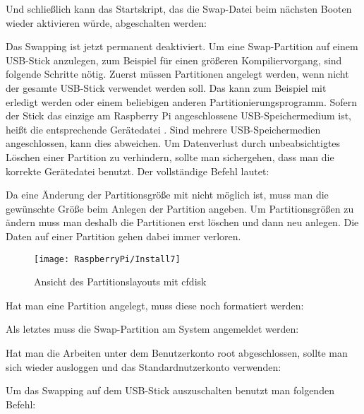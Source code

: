 
Und schließlich kann das Startskript, das die Swap-Datei beim nächsten Booten wieder aktivieren würde, abgeschalten werden:


Das Swapping ist jetzt permanent deaktiviert. Um eine Swap-Partition auf einem USB-Stick anzulegen, zum Beispiel für einen größeren Kompiliervorgang, sind folgende Schritte nötig. Zuerst müssen Partitionen angelegt werden, wenn nicht der gesamte USB-Stick verwendet werden soll. Das kann zum Beispiel mit  erledigt werden oder einem beliebigen anderen Partitionierungsprogramm. Sofern der Stick das einzige am Raspberry Pi angeschlossene USB-Speichermedium ist, heißt die entsprechende Gerätedatei . Sind mehrere USB-Speichermedien angeschlossen, kann dies abweichen. Um Datenverlust durch unbeabsichtigtes Löschen einer Partition zu verhindern, sollte man sichergehen, dass man die korrekte Gerätedatei benutzt. Der vollständige Befehl lautet:



Da eine Änderung der Partitionsgröße mit  nicht möglich ist, muss man die gewünschte Größe beim Anlegen der Partition angeben. Um Partitionsgrößen zu ändern muss man deshalb die Partitionen erst löschen und dann neu anlegen. Die Daten auf einer Partition gehen dabei immer verloren.


\begin{figure}[!h]
	\centering
	
	\texttt{[image: RaspberryPi/Install7]}
	
	\caption{Ansicht des Partitionslayouts mit cfdisk }
	
\end{figure}


Hat man eine Partition angelegt, muss diese noch formatiert werden:


Als letztes muss die Swap-Partition am System angemeldet werden:


Hat man die Arbeiten unter dem Benutzerkonto root abgeschlossen, sollte man sich wieder ausloggen und das Standardnutzerkonto verwenden:


Um das Swapping auf dem USB-Stick auszuschalten benutzt man folgenden Befehl:

